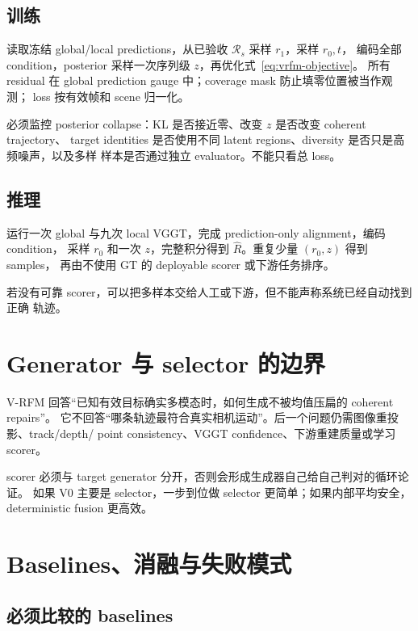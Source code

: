 \documentclass[UTF8,a4paper,11pt]{ctexart}
\begin{document}
\subsection{训练}

读取冻结 global/local predictions，从已验收 $\mathcal R_s$ 采样 $r_1$，采样 $r_0,t$，
编码全部 condition，posterior 采样一次序列级 $z$，再优化式~\eqref{eq:vrfm-objective}。
所有 residual 在 global prediction gauge 中；coverage mask 防止填零位置被当作观测；
loss 按有效帧和 scene 归一化。

必须监控 posterior collapse：KL 是否接近零、改变 $z$ 是否改变 coherent trajectory、
target identities 是否使用不同 latent regions、diversity 是否只是高频噪声，以及多样
样本是否通过独立 evaluator。不能只看总 loss。

\subsection{推理}

运行一次 global 与九次 local VGGT，完成 prediction-only alignment，编码 condition，
采样 $r_0$ 和一次 $z$，完整积分得到 $\widehat R$。重复少量 $(r_0,z)$ 得到 samples，
再由不使用 GT 的 deployable scorer 或下游任务排序。

若没有可靠 scorer，可以把多样本交给人工或下游，但不能声称系统已经自动找到正确
轨迹。

\section{Generator 与 selector 的边界}

V-RFM 回答“已知有效目标确实多模态时，如何生成不被均值压扁的 coherent repairs”。
它不回答“哪条轨迹最符合真实相机运动”。后一个问题仍需图像重投影、track/depth/
point consistency、VGGT confidence、下游重建质量或学习 scorer。

scorer 必须与 target generator 分开，否则会形成生成器自己给自己判对的循环论证。
如果 V0 主要是 selector，一步到位做 selector 更简单；如果内部平均安全，deterministic
fusion 更高效。

\section{Baselines、消融与失败模式}

\subsection{必须比较的 baselines}
\end{document}
